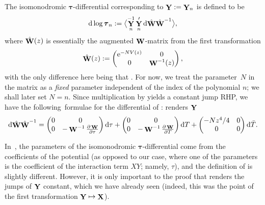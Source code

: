 \documentclass[10pt,a4paper]{amsart}
\DeclareMathOperator{\YY}{{\bf Y}}
\DeclareMathOperator{\XX}{{\bf X}}
\DeclareMathOperator{\WW}{{\bf W}}
\numberwithin{equation}{section}
\begin{document}
 The isomonodromic $\boldsymbol{\tau}$-differential corresponding to $\YY := \YY_n$ is defined to be
 \begin{equation*}
 {\rm d}\log \boldsymbol{\tau}_n := \bigl\langle \YY_n^{-1}\YY_n' {\rm d}\hat{\WW} \hat{\WW}^{-1}\bigr\rangle,
 \end{equation*}
 where $\hat{\WW}(z)$ is essentially the augmented $\WW$-matrix from the first transformation
 \begin{equation*}
 \hat{\WW}(z) :=
 \begin{pmatrix}
 {\rm e}^{-NV(z)} & 0 \\
 0 & \WW^{-1}(z)
 \end{pmatrix},
 \end{equation*}
 with the only difference here being that . For now, we treat the parameter~$N$ in the matrix \smash{$\hat{\WW}$} as a \textit{fixed} parameter independent of the index of the polynomial $n$; we shall later set $N = n$. Since multiplication by \smash{$\hat{\WW}$} yields a constant jump RHP, we have the following~formulae for the differential of \smash{${\rm d}\hat{\WW} \hat{\WW}^{-1}$}:
 renders $\YY$
 \begin{equation*}
 {\rm d}\hat{\WW} \hat{\WW}^{-1} =
 \begin{pmatrix}
 0 & 0\\
 0 & -\WW^{-1}\frac{\partial \WW }{\partial \tau}
 \end{pmatrix} {\rm d}\tau +
 \begin{pmatrix}
 0 & 0\\
 0 & -\WW^{-1}\frac{\partial\WW }{\partial T}
 \end{pmatrix} {\rm d}T
 + \begin{pmatrix}
 -Nz^4/4 & 0\\
 0 & 0
 \end{pmatrix} {\rm d}\bar{T}.
 \end{equation*}

In~\cite{Bertola-Marchal}, the parameters of the isomonodromic $\boldsymbol{\tau}$-differential come from the coefficients of the potential (as opposed to
our case, where one of the parameters is the coefficient of the interaction term $XY$; namely, $\tau$), and the
definition of \smash{${\rm d}\hat{\WW} \hat{\WW}^{-1}$} is slightly different. However, it is only important to the proof that \smash{$\hat{\WW}$} renders the jumps of $\YY$ constant, which we have already seen (indeed, this was the point of the first transformation $\YY\mapsto\XX$).
\end{document}
